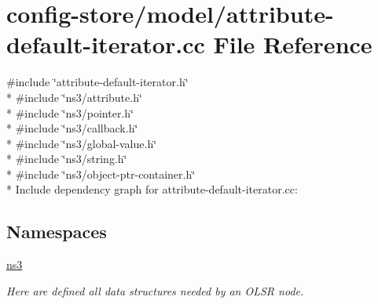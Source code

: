 \hypertarget{attribute-default-iterator_8cc}{}\section{config-\/store/model/attribute-\/default-\/iterator.cc File Reference}
\label{attribute-default-iterator_8cc}
{\ttfamily \#include \char`\"{}attribute-\/default-\/iterator.\+h\char`\"{}}\\*
{\ttfamily \#include \char`\"{}ns3/attribute.\+h\char`\"{}}\\*
{\ttfamily \#include \char`\"{}ns3/pointer.\+h\char`\"{}}\\*
{\ttfamily \#include \char`\"{}ns3/callback.\+h\char`\"{}}\\*
{\ttfamily \#include \char`\"{}ns3/global-\/value.\+h\char`\"{}}\\*
{\ttfamily \#include \char`\"{}ns3/string.\+h\char`\"{}}\\*
{\ttfamily \#include \char`\"{}ns3/object-\/ptr-\/container.\+h\char`\"{}}\\*
Include dependency graph for attribute-\/default-\/iterator.cc\+:
\subsection*{Namespaces}
\begin{DoxyCompactItemize}
\item 
 \hyperlink{namespacens3}{ns3}
\begin{DoxyCompactList}\small\item\em Here are defined all data structures needed by an O\+L\+SR node. \end{DoxyCompactList}\end{DoxyCompactItemize}
